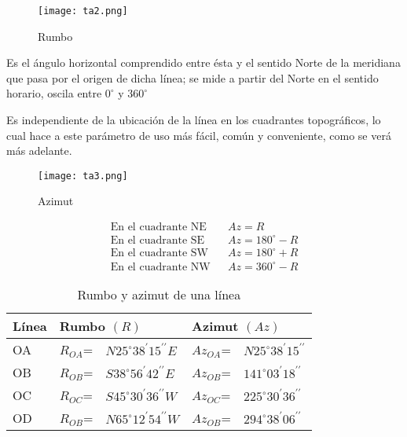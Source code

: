 \begin{figure}[h!]
    \centering
    \texttt{[image: ta2.png]}
    \caption{Rumbo}
    \label{ta2}
\end{figure}

  \begin{definition}[Azimut]
    Es el ángulo horizontal comprendido entre ésta y el sentido Norte de la meridiana que pasa por el origen de dicha línea; se mide a partir del Norte  en el sentido horario, oscila entre $0^{\circ}$ y $360^{\circ}$
\end{definition}

Es independiente de la ubicación de la línea en los cuadrantes topográficos, lo cual hace a este parámetro de uso más fácil, común y conveniente, como se verá más adelante.

\begin{figure}[h!]
    \centering
    \texttt{[image: ta3.png]}
    \caption{Azimut}
    \label{ta3}
  \end{figure}

\begin{align}
    \text{En el cuadrante NE}&&Az=R\\ 
    \text{En el cuadrante SE}&&Az=180^{\circ}-R\\ 
    \text{En el cuadrante SW}&&Az=180^{\circ}+R\\ 
    \text{En el cuadrante NW}&&Az=360^{\circ}-R 
\end{align}

\begin{table}[h!]
    \centering
    \begin{tabular}{@{}lllll@{}}
        \toprule
        Línea & \multicolumn{2}{l}{Rumbo $(R)$}                        & \multicolumn{2}{l}{Azimut $(Az)$}                      \\ \midrule
        OA    & $R_{OA}$= & $N25^{\circ}38^{\prime}15^{\prime\prime}E$ & $Az_{OA}$= & $N25^{\circ}38^{\prime}15^{\prime\prime}$ \\
        OB    & $R_{OB}$= & $S38^{\circ}56^{\prime}42^{\prime\prime}E$ & $Az_{OB}$= & $141^{\circ}03^{\prime}18^{\prime\prime}$ \\
        OC    & $R_{OC}$= & $S45^{\circ}30^{\prime}36^{\prime\prime}W$ & $Az_{OC}$= & $225^{\circ}30^{\prime}36^{\prime\prime}$ \\
        OD    & $R_{OB}$= & $N65^{\circ}12^{\prime}54^{\prime\prime}W$ & $Az_{OB}$= & $294^{\circ}38^{\prime}06^{\prime\prime}$ \\ \bottomrule
    \end{tabular}
    \caption{Rumbo y azimut de una línea}
    \label{tabta1}
\end{table}

